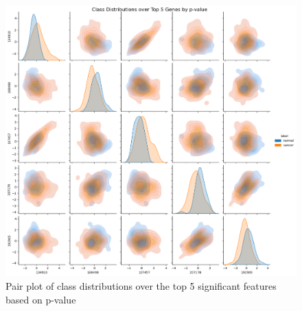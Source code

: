 \documentclass[twocolumn]{article}
\begin{document}
\begin{figure}[H]
    \centering
    \includegraphics[width=0.85\linewidth]{figures/PairPlot_SVA.png}
    \caption{Pair plot of class distributions over the top 5 significant features based on p-value}
    \label{fig:pp-sva}
\end{figure}
\end{document}
